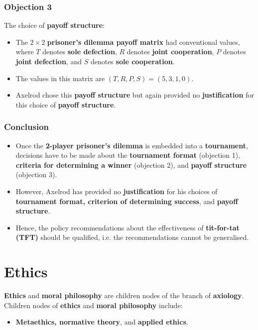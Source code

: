 \documentclass[11pt]{article}
\begin{document}
\subsubsection{Objection 3}
\label{sec:org7413d27}
The choice of \textbf{payoff structure}:
\begin{itemize}
\item The \(2 \times 2\) \textbf{prisoner's dilemma payoff matrix} had conventional values, where \(T\) denotes \textbf{sole defection}, \(R\) denotes \textbf{joint cooperation}, \(P\) denotes \textbf{joint defection}, and \(S\) denotes \textbf{sole cooperation}.
\item The values in this matrix are \((T, R, P, S) = (5, 3, 1, 0)\).
\item Axelrod chose this \textbf{payoff structure} but again provided no \textbf{justification} for this choice of \textbf{payoff structure}.
\end{itemize}
\subsubsection{Conclusion}
\label{sec:orgcee6fc9}
\begin{itemize}
\item Once the \textbf{2-player prisoner's dilemma} is embedded into a \textbf{tournament}, decisions have to be made about the \textbf{tournament format} (objection 1), \textbf{criteria for determining a winner} (objection 2), and \textbf{payoff structure} (objection 3).
\item However, Axelrod has provided no \textbf{justification} for his choices of \textbf{tournament format, criterion of determining success}, and \textbf{payoff structure}.
\item Hence, the policy recommendations about the effectiveness of \textbf{tit-for-tat (TFT)} should be qualified, i.e. the recommendations cannot be generalised.
\end{itemize}

 \newpage
\section{Ethics}
\label{sec:org5436c5a}
\textbf{Ethics} and \textbf{moral philosophy} are children nodes of the branch of \textbf{axiology}. Children nodes of \textbf{ethics} and \textbf{moral philosophy} include:
\begin{itemize}
\item \textbf{Metaethics, normative theory}, and \textbf{applied ethics}.
\end{itemize}
\end{document}
